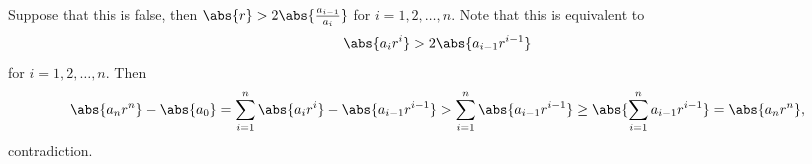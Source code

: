 Suppose that this is false, then $\abs{r}>2\abs{\frac{a_{i-1}}{a_i}}$ for $i=1,2,\ldots,n$. Note that this is equivalent to \[\abs{a_ir^i}>2\abs{a_{i-1}r^{i-1}}\] for $i=1,2,\ldots,n$. Then \[\abs{a_nr^n}-\abs{a_0}=\displaystyle\sum_{i=1}^n\abs{a_ir^i}-\abs{a_{i-1}r^{i-1}}>\displaystyle\sum_{i=1}^n\abs{a_{i-1}r^{i-1}}\geq\abs{\displaystyle\sum_{i=1}^na_{i-1}r^{i-1}}=\abs{a_nr^n},\] contradiction.